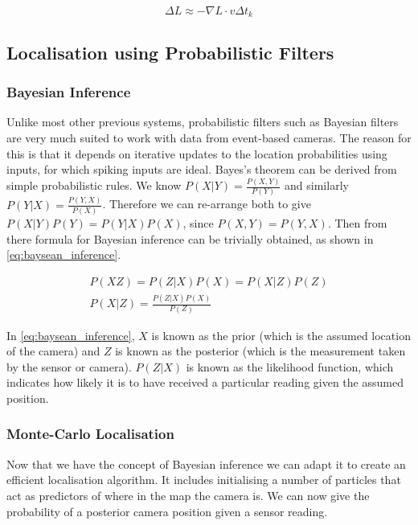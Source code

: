 \begin{equation}
      \Delta L \approx -\nabla L \cdot v \Delta t_k
      \label{eq:optic_flow}
\end{equation}

\subsection{Localisation using Probabilistic Filters} \label{ssec:prob_filters}

\subsubsection{Bayesian Inference}

Unlike most other previous systems, probabilistic filters such as Bayesian filters are very much suited to work with data from event-based cameras. The reason for this is that it depends on iterative updates to the location probabilities using inputs, for which spiking inputs are ideal. Bayes's theorem can be derived from simple probabilistic rules\cite{BayesLaw}. We know $P(X|Y) = \frac{P(X, Y)}{P(Y)} $ and similarly $ P(Y|X) = \frac{P(Y, X)}{P(X)} $. Therefore we can re-arrange both to give $ P(X|Y)P(Y) = P(Y|X)P(X) $, since $ P(X, Y) = P(Y, X) $. Then from there formula for Bayesian inference can be trivially obtained, as shown in \autoref{eq:baysean_inference}.

\begin{equation}
      \begin{gathered}
            P(XZ) = P(Z|X)P(X) = P(X|Z)P(Z)\\
            P(X|Z) = \frac{P(Z|X)P(X)}{P(Z)}
      \end{gathered}
      \label{eq:baysean_inference}
\end{equation}

In \autoref{eq:baysean_inference}, $ X $ is known as the prior (which is the assumed location of the camera) and $ Z $ is known as the posterior (which is the measurement taken by the sensor or camera). $P(Z|X) $ is known as the likelihood function, which indicates how likely it is to have received a particular reading given the assumed position.

\subsubsection{Monte-Carlo Localisation}

Now that we have the concept of Bayesian inference we can adapt it to create an efficient localisation algorithm. It includes initialising a number of particles that act as predictors of where in the map the camera is. We can now give the probability of a posterior camera position given a sensor reading.

